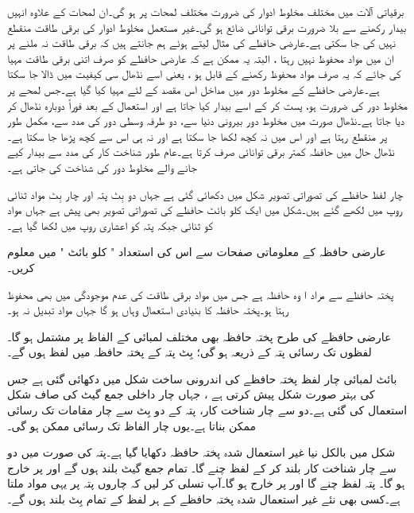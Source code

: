 برقیاتی آلات میں مختلف مخلوط ادوار کی  ضرورت مختلف   لمحات  پر  ہو گی۔ان لمحات کے علاوہ انہیں بیدار رکھنے سے بلا ضرورت برقی توانائی   ضائع ہو گی۔غیر مستعمل  مخلوط ادوار کی برقی طاقت منقطع نہیں کی جا سکتی ہے۔عارضی حافظے کی مثال لیتے  ہوئے ہم  جانتے ہیں  کہ برقی طاقت نہ ملنے پر ان میں مواد محفوظ نہیں رہتا ، البتہ یہ  ممکن ہے کہ عارضی حافظے کو صرف اتنی برقی طاقت مہیا کی جائے کہ یہ صرف مواد محفوظ رکھنے کے قابل ہو ، یعنی اسے  نڈھال سی کیفیت میں ڈالا جا سکتا ہے۔عارضی حافظے  کے مخلوط دور میں   مداخل اس مقصد کے لئے مہیا کیا گیا ہے۔جس لمحے پر مخلوط دور کی ضرورت ہو،      پست کر کے اسے بیدار کیا جاتا ہے اور استعمال کے بعد فوراً دوبارہ نڈھال کر دیا جاتا ہے۔نڈھال صورت میں مخلوط دور بیرونی دنیا سے، دو طرفہ وسطی دور کی مدد سے، مکمل طور  پر منقطع رہتا ہے اور اس میں نہ کچھ لکھا جا سکتا ہے اور نہ ہی اس سے کچھ پڑھا جا سکتا ہے۔نڈھال حال  میں حافظہ کمتر برقی توانائی صرف کرتا   ہے۔عام طور شناخت کار کی مدد سے   بیدار کیے جانے والے مخلوط دور کی  شناخت کی جاتی ہے۔



چار  لفظ  حافظے کی تصوراتی تصویر شکل  میں دکھائی گئی ہے جہاں دو بِٹ پتہ اور چار بِٹ مواد   ثنائی  روپ میں لکھے    گئے   ہیں۔شکل میں ایک کلو بائٹ حافظے کی تصوراتی تصویر بھی  پیش ہے جہاں مواد کو ثنائی جبکہ پتہ کو اعشاری  روپ میں لکھا گیا ہے۔

عارضی حافظہ  کے معلوماتی صفحات سے اس کی  استعداد "  کلو بائٹ " میں   معلوم  کریں۔



پختہ حافظے سے مراد ا وہ حافظہ ہے جس میں مواد برقی طاقت کی عدم موجودگی میں بھی محفوظ رہتا ہو۔پختہ حافظہ کا بنیادی استعمال وہاں ہو گا جہاں مواد تبدیل نہ ہو۔

عارضی حافظے کی طرح پختہ حافظہ بھی مختلف لمبائی کے الفاظ پر مشتمل ہو گا۔لفظوں تک رسائی   پتہ کے ذریعہ  ہو گی؛  بِٹ پتہ کے پختہ حافظہ میں   لفظ ہوں گے۔

بائٹ لمبائی  چار  لفظ  پختہ حافظے  کی اندرونی ساخت شکل  میں دکھائی گئی ہے جس کی بہتر صورت  شکل   پیش کرتی ہے ،  جہاں چار داخلی جمع گیٹ کی صاف شکل استعمال کی گئی ہے۔دو سے چار شناخت کار، پتہ کے دو بِٹ سے چار مقامات  تک رسائی ممکن بناتا ہے۔یوں چار الفاظ تک رسائی ممکن ہو گی۔



شکل   میں بالکل نیا غیر استعمال شدہ پختہ حافظہ دکھایا گیا ہے۔پتہ      کی صورت میں دو سے چار شناخت کار   بلند کر کے لفظ   چنے گا۔ تمام جمع گیٹ بلند ہوں گے اور  پر  خارج ہو گا۔ پتہ   لفظ   چنے گا اور  پر  خارج ہو گا۔آپ تسلی کر لیں کہ چاروں پتہ پر یہی مواد ملتا ہے۔کسی بھی نئے غیر استعمال شدہ پختہ حافظے کے ہر لفظ کے تمام بِٹ بلند   ہوں گے۔


